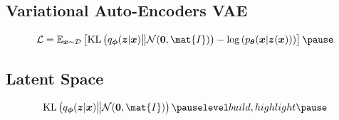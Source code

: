 \Outline %

\begin{slide}
\section[-2]{Variational Auto-Encoders VAE}

\pb
\pause{}

\begin{center}
  \pause
\end{center}
\begin{align*}
    \mathcal{L} =
  \av[\bm{x}\sim\mathcal{D}]{
  \KL{q_{\bm{\phi}}(\bm{z}|\bm{x})}{\mathcal{N}(\bm{0},\mat{I})}
  - \logg{p_{\bm{\theta}}(\bm{x}|\bm{z}(\bm{x}))}}\pause
\end{align*}
\end{slide}



\begin{slide}
\section[-2]{Latent Space}

\pb\pause{}
\begin{center}
  \pause
\end{center}
\begin{align*}
  \KL{q_{\bm{\phi}}(\bm{z}|\bm{x})}{\mathcal{N}(\bm{0},\mat{I})}\pauseb
\end{align*}
\end{slide}


